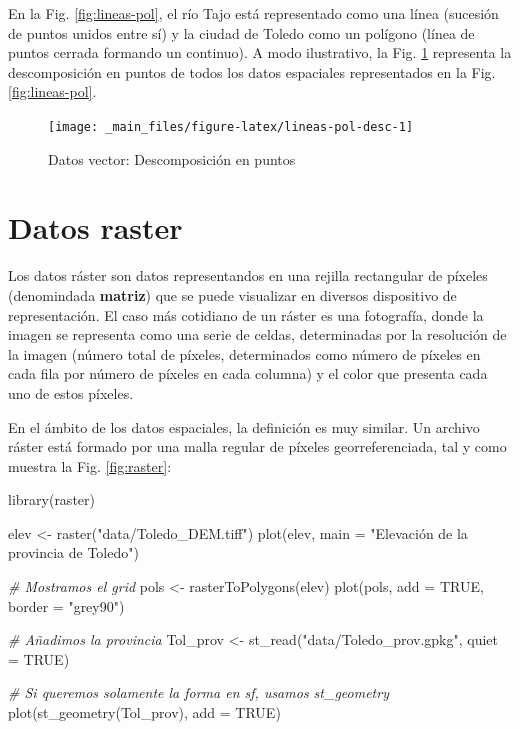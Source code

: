 \documentclass[
]{book}
\newenvironment{Shaded}{\begin{snugshade}}{\end{snugshade}}
\newcommand{\AttributeTok}[1]{\textcolor[rgb]{0.77,0.63,0.00}{#1}}
\newcommand{\CommentTok}[1]{\textcolor[rgb]{0.56,0.35,0.01}{\textit{#1}}}
\newcommand{\ConstantTok}[1]{\textcolor[rgb]{0.00,0.00,0.00}{#1}}
\newcommand{\FunctionTok}[1]{\textcolor[rgb]{0.00,0.00,0.00}{#1}}
\newcommand{\NormalTok}[1]{#1}
\newcommand{\OtherTok}[1]{\textcolor[rgb]{0.56,0.35,0.01}{#1}}
\newcommand{\StringTok}[1]{\textcolor[rgb]{0.31,0.60,0.02}{#1}}
\begin{document}
En la Fig. \ref{fig:lineas-pol}, el río Tajo está representado como una línea
(sucesión de puntos unidos entre sí) y la ciudad de Toledo como un polígono
(línea de puntos cerrada formando un continuo). A modo ilustrativo, la Fig.
\ref{fig:lineas-pol-desc} representa la descomposición en puntos de todos los
datos espaciales representados en la Fig. \ref{fig:lineas-pol}.

\begin{figure}

{\centering \texttt{[image: \_main\_files/figure-latex/lineas-pol-desc-1]} 

}

\caption{Datos vector: Descomposición en puntos}\label{fig:lineas-pol-desc}
\end{figure}

\hypertarget{datos-raster}{%
\section{Datos raster}\label{datos-raster}}

Los datos ráster son datos representandos en una rejilla rectangular de píxeles
(denomindada \textbf{matriz}) que se puede visualizar en diversos dispositivo de
representación. El caso más cotidiano de un ráster es una fotografía, donde la
imagen se representa como una serie de celdas, determinadas por la resolución de
la imagen (número total de píxeles, determinados como número de píxeles en cada
fila por número de píxeles en cada columna) y el color que presenta cada uno de
estos píxeles.

En el ámbito de los datos espaciales, la definición es muy similar. Un archivo
ráster está formado por una malla regular de píxeles georreferenciada, tal y
como muestra la Fig. \ref{fig:raster}:

\begin{Shaded}
\begin{Highlighting}[]

\FunctionTok{library}\NormalTok{(raster)}

\NormalTok{elev }\OtherTok{\textless{}{-}} \FunctionTok{raster}\NormalTok{(}\StringTok{"data/Toledo\_DEM.tiff"}\NormalTok{)}
\FunctionTok{plot}\NormalTok{(elev, }\AttributeTok{main =} \StringTok{"Elevación de la provincia de Toledo"}\NormalTok{)}

\CommentTok{\# Mostramos el grid}
\NormalTok{pols }\OtherTok{\textless{}{-}} \FunctionTok{rasterToPolygons}\NormalTok{(elev)}
\FunctionTok{plot}\NormalTok{(pols, }\AttributeTok{add =} \ConstantTok{TRUE}\NormalTok{, }\AttributeTok{border =} \StringTok{"grey90"}\NormalTok{)}

\CommentTok{\# Añadimos la provincia}
\NormalTok{Tol\_prov }\OtherTok{\textless{}{-}} \FunctionTok{st\_read}\NormalTok{(}\StringTok{"data/Toledo\_prov.gpkg"}\NormalTok{, }\AttributeTok{quiet =} \ConstantTok{TRUE}\NormalTok{)}

\CommentTok{\# Si queremos solamente la forma en sf, usamos st\_geometry}
\FunctionTok{plot}\NormalTok{(}\FunctionTok{st\_geometry}\NormalTok{(Tol\_prov), }\AttributeTok{add =} \ConstantTok{TRUE}\NormalTok{)}
\end{Highlighting}
\end{Shaded}
\end{document}
